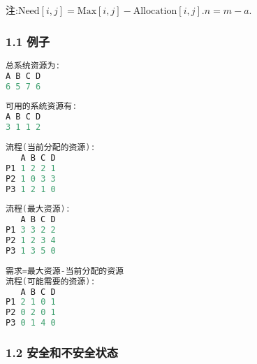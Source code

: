 注:$\text{Need}[i, j] = \text{Max}[i, j] - \text{Allocation}[i, j].n=m-a.$
\subsubsection{1.1 例子}
\begin{lstlisting}[language=cpp]
总系统资源为:
A B C D
6 5 7 6
\end{lstlisting}
\begin{lstlisting}[language=cpp]
可用的系统资源有:
A B C D
3 1 1 2
\end{lstlisting}
\begin{lstlisting}[language=cpp]
流程(当前分配的资源):
   A B C D
P1 1 2 2 1
P2 1 0 3 3
P3 1 2 1 0
\end{lstlisting}
\begin{lstlisting}[language=cpp]
流程(最大资源):
   A B C D
P1 3 3 2 2
P2 1 2 3 4
P3 1 3 5 0
\end{lstlisting}
\begin{lstlisting}[language=cpp]
需求=最大资源-当前分配的资源
流程(可能需要的资源):
   A B C D
P1 2 1 0 1
P2 0 2 0 1
P3 0 1 4 0
\end{lstlisting}
\subsubsection{1.2 安全和不安全状态}